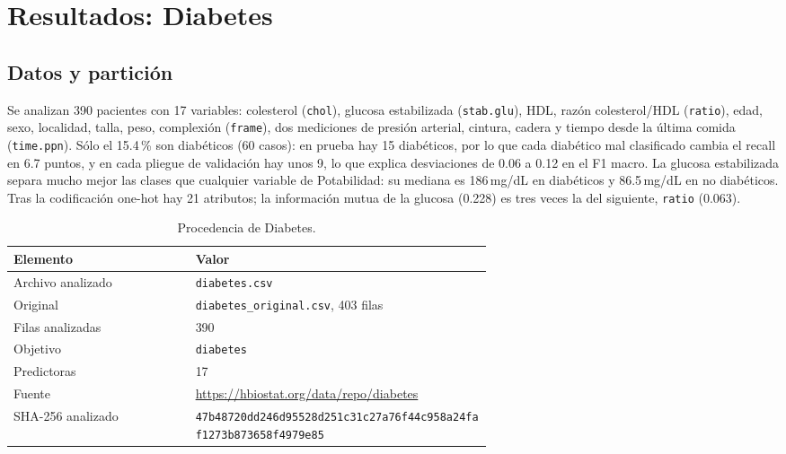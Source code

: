 \documentclass[11pt]{article}
\begin{document}
\FloatBarrier

\clearpage

\section{Resultados: Diabetes}

\subsection{Datos y partición}

Se analizan 390 pacientes con 17 variables: colesterol (\texttt{chol}), glucosa
estabilizada (\texttt{stab.glu}), HDL, razón colesterol/HDL (\texttt{ratio}), edad,
sexo, localidad, talla, peso, complexión (\texttt{frame}), dos mediciones de presión
arterial, cintura, cadera y tiempo desde la última comida (\texttt{time.ppn}). Sólo el
15.4\,\% son diabéticos (60 casos): en prueba hay 15 diabéticos, por lo que cada
diabético mal clasificado cambia el recall en 6.7 puntos, y en cada pliegue de
validación hay unos 9, lo que explica desviaciones de 0.06 a 0.12 en el F1 macro. La
glucosa estabilizada separa mucho mejor las clases que cualquier variable de
Potabilidad: su mediana es 186\,mg/dL en diabéticos y 86.5\,mg/dL en no diabéticos.
Tras la codificación one-hot hay 21 atributos; la información mutua de la glucosa
(0.228) es tres veces la del siguiente, \texttt{ratio} (0.063).

\begin{table}[H]\centering\small
\caption{Procedencia de Diabetes.}
\begin{tabular}{lp{0.62\linewidth}}\toprule
Elemento & Valor \\ \midrule
Archivo analizado & \texttt{diabetes.csv} \\
Original & \texttt{diabetes\_\allowbreak{}original.csv}, 403 filas \\
Filas analizadas & 390 \\
Objetivo & \texttt{diabetes} \\
Predictoras & 17 \\
Fuente & \url{https://hbiostat.org/data/repo/diabetes} \\
SHA-256 analizado & {\footnotesize\texttt{47b48720dd246d95528d251c31c27a76}\newline\texttt{f44c958a24faf1273b873658f4979e85}} \\
\bottomrule\end{tabular}
\end{table}
\end{document}
